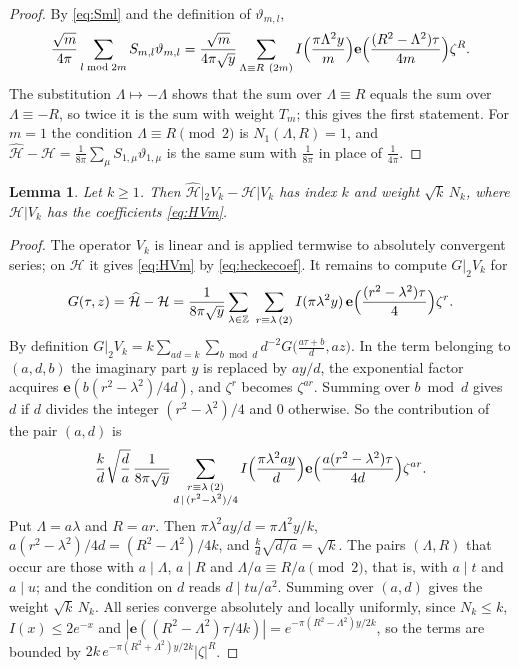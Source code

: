 \documentclass[11pt]{amsart}
\newtheorem{lemma}[theorem]{Lemma}
\theoremstyle{definition}
\newcommand{\ZZ}{\mathbb{Z}}
\newcommand{\vt}{\vartheta}
\newcommand{\Hc}{\mathcal{H}}
\newcommand{\Hh}{\widehat{\mathcal{H}}}
\newcommand{\e}{\mathbf{e}}
\begin{document}
\begin{proof}
By \eqref{eq:Sml} and the definition of $\vt_{m,l}$,
\[
\frac{\sqrt m}{4\pi}\sum_{l\bmod 2m}S_{m,l}\vt_{m,l}=\frac{\sqrt m}{4\pi\sqrt y}\sum_{\Lambda\equiv R\ (2m)}I\Bigl(\frac{\pi\Lambda^2y}{m}\Bigr)\e\Bigl(\frac{(R^2-\Lambda^2)\tau}{4m}\Bigr)\zeta^R .
\]
The substitution $\Lambda\mapsto-\Lambda$ shows that the sum over $\Lambda\equiv R$ equals the sum over $\Lambda\equiv-R$, so twice it is the sum with weight $T_m$; this gives the first statement. For $m=1$ the condition $\Lambda\equiv R\pmod2$ is $N_1(\Lambda,R)=1$, and $\Hh-\Hc=\frac1{8\pi}\sum_\mu S_{1,\mu}\vt_{1,\mu}$ is the same sum with $\frac1{8\pi}$ in place of $\frac1{4\pi}$.
\end{proof}

\begin{lemma}\label{lem:Vk}
Let $k\ge1$. Then $\Hh|_2V_k-\Hc|V_k$ has index $k$ and weight $\sqrt k\,N_k$, where $\Hc|V_k$ has the coefficients \eqref{eq:HVm}.
\end{lemma}

\begin{proof}
The operator $V_k$ is linear and is applied termwise to absolutely convergent series; on $\Hc$ it gives \eqref{eq:HVm} by \eqref{eq:heckecoef}. It remains to compute $G|_2V_k$ for
\[
G(\tau,z)=\Hh-\Hc=\frac{1}{8\pi\sqrt y}\sum_{\lambda\in\ZZ}\ \sum_{r\equiv\lambda\,(2)}I(\pi\lambda^2y)\,\e\Bigl(\frac{(r^2-\lambda^2)\tau}{4}\Bigr)\zeta^r .
\]
By definition $G|_2V_k=k\sum_{ad=k}\sum_{b\bmod d}d^{-2}G\bigl(\frac{a\tau+b}{d},az\bigr)$. In the term belonging to $(a,d,b)$ the imaginary part $y$ is replaced by $ay/d$, the exponential factor acquires $\e(b(r^2-\lambda^2)/4d)$, and $\zeta^r$ becomes $\zeta^{ar}$. Summing over $b\bmod d$ gives $d$ if $d$ divides the integer $(r^2-\lambda^2)/4$ and $0$ otherwise. So the contribution of the pair $(a,d)$ is
\[
\frac{k}{d}\sqrt{\frac da}\,\frac{1}{8\pi\sqrt y}\sum_{\substack{r\equiv\lambda\,(2)\\ d\,\mid\,(r^2-\lambda^2)/4}}I\Bigl(\frac{\pi\lambda^2ay}{d}\Bigr)\e\Bigl(\frac{a(r^2-\lambda^2)\tau}{4d}\Bigr)\zeta^{ar}.
\]
Put $\Lambda=a\lambda$ and $R=ar$. Then $\pi\lambda^2ay/d=\pi\Lambda^2y/k$, $a(r^2-\lambda^2)/4d=(R^2-\Lambda^2)/4k$, and $\frac kd\sqrt{d/a}=\sqrt k$. The pairs $(\Lambda,R)$ that occur are those with $a\mid\Lambda$, $a\mid R$ and $\Lambda/a\equiv R/a\pmod2$, that is, with $a\mid t$ and $a\mid u$; and the condition on $d$ reads $d\mid tu/a^2$. Summing over $(a,d)$ gives the weight $\sqrt k\,N_k$. All series converge absolutely and locally uniformly, since $N_k\le k$, $I(x)\le2e^{-x}$ and $|\e((R^2-\Lambda^2)\tau/4k)|=e^{-\pi(R^2-\Lambda^2)y/2k}$, so the terms are bounded by $2k\,e^{-\pi(R^2+\Lambda^2)y/2k}|\zeta|^R$.
\end{proof}
\end{document}
